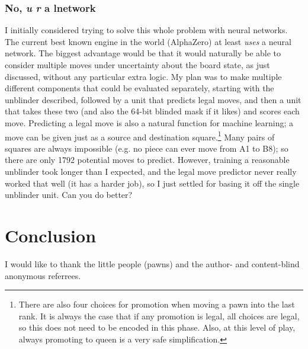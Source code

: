 \documentclass[twocolumn]{amsart}
\begin{document}
\subsubsection{No, {\em u r} a lnetwork} \label{sec:legalmove}
I initially considered trying to solve this whole problem with neural
networks. The current best known engine in the world (AlphaZero) at
least {\em uses} a neural network.
The biggest advantage would be that it would naturally be able to
consider multiple moves under uncertainty about the board state, as
just discussed, without any particular extra logic. My plan was to
make multiple different components that could be evaluated
separately, starting with the unblinder described, followed by a unit
that predicts legal moves, and then a unit that takes these two (and
also the 64-bit blinded mask if it likes) and scores each move.
Predicting a legal move is also a natural function for machine
learning; a move can be given just as a source and destination
square.\footnote{ There are also four choices for promotion when
  moving a pawn into the last rank. It is always the case that if any
  promotion is legal, all choices are legal, so this does not need to
  be encoded in this phase. Also, at this level of play, always
  promoting to queen is a very safe simplification.} Many pairs of
squares are always impossible (e.g. no piece can ever move from A1 to
B8); so there are only 1792 potential moves to predict. However,
training a reasonable unblinder took longer than I expected, and the
legal move predictor never really worked that well (it has a harder
job),
so I just settled for basing it off the single unblinder unit. Can you
do better?

\section{Conclusion}
% 

I would like to thank the little people (pawns) and the author-
and content-blind anonymous referrees.
\end{document}
